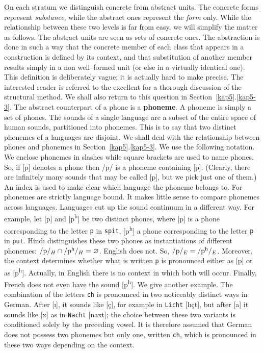 On each stratum we distinguish concrete from abstract units. The concrete 
forms represent {\it substance}, while the abstract ones represent the 
{\it form} only. While the relationship between these two levels is 
far from easy, we will simplify the matter as follows. The abstract 
units are seen as sets of concrete ones. The abstraction is done
in such a way that the concrete member of each class that appears
in a construction is defined by its context, and that substitution
of another member results simply in a non well--formed unit (or
else in a virtually identical one). This definition is
deliberately vague; it is actually hard to make precise. The
interested reader is referred to the excellent
\cite{harris:structural} for a thorough discussion of the
structural method. We shall also return to this question in 
Section~\ref{kap5}.\ref{kap5-3}. The abstract counterpart of a phone is a
\textbf{phoneme}. A phoneme is simply a set of phones. The sounds of
a single language are a subset of the entire space of human
sounds, partitioned into phonemes. This is to say that two
distinct phonemes of a languages are disjoint. We shall deal with
the relationship between phones and phonemes in 
Section~\ref{kap5}.\ref{kap5-3}. We use the following notation. We enclose
phonemes in slashes while square brackets are used to name phones.
So, if [p] denotes a phone then /p/ is a phoneme containing [p].
(Clearly, there are infinitely many sounds that may be called [p],
but we pick just one of them.) An index is used to make clear which
language the phoneme belongs to. For phonemes are strictly language 
bound. It makes little sense to compare phonemes across languages. 
Languages cut up the sound continuum in a different way. For example, 
let [p] and [p\textsuperscript{h}] be two distinct phones, 
where [p] is a phone corresponding to the letter {\tt p} in {\tt spit}, 
[p\textsuperscript{h}] a phone corresponding to the letter {\tt p} 
in {\tt put}. 
Hindi distinguishes these two phones as instantiations of different
phonemes: $/\mbox{\rm p}/_H \cap /\mbox{\rm p\textsuperscript{h}}/_H 
= \varnothing$.  English does not. So, $/\mbox{\rm p}/_E = 
/\mbox{\rm p\textsuperscript{h}}/_E$.
Moreover, the context determines whether what is written {\tt p}
is pronounced either as [p] or as [p\textsuperscript{h}]. Actually, 
in English there is no context in which both will occur. Finally, 
French does not even have the sound [p\textsuperscript{h}].  We give 
another example. The combination of the letters {\tt ch} is pronounced 
in two noticeably distinct ways in 
German. After [\i], it sounds like 
[\c{c}], for example in {\tt Licht} [l{\i}\c{c}t], but after [a] it 
sounds like [x] as in {\tt Nacht} [naxt]; the choice between these 
two variants is conditioned solely by the preceding vowel. It is 
therefore assumed that German does not possess two phonemes but only 
one, written {\tt ch}, which is pronounced in these two ways depending 
on the context.

